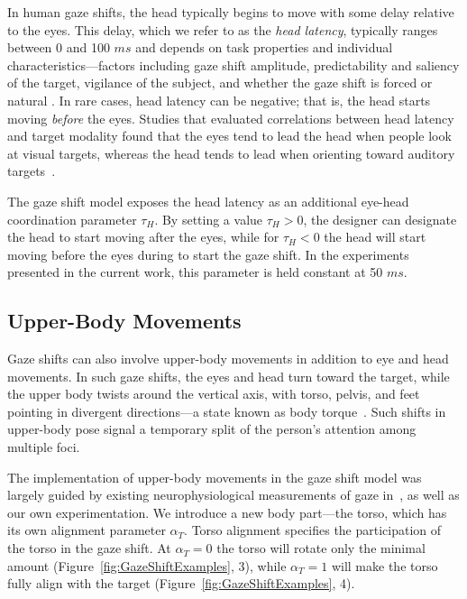 In human gaze shifts, the head typically begins to move with some delay relative to the eyes. This delay, which we refer to as the \emph{head latency}, typically ranges between 0 and 100 $ms$ and depends on task properties and individual characteristics---factors including gaze shift amplitude, predictability and saliency of the target, vigilance of the subject, and whether the gaze shift is forced or natural \citep{pelz2001coordination,zangemeister1982types}. In rare cases, head latency can be negative; that is, the head starts moving \emph{before} the eyes. Studies that evaluated correlations between head latency and target modality found that the eyes tend to lead the head when people look at visual targets, whereas the head tends to lead when orienting toward auditory targets~\citep{goldring1996combined,goossens1997human}.

The gaze shift model exposes the head latency as an additional eye-head coordination parameter $\tau_H$. By setting a value $\tau_H > 0$, the designer can designate the head to start moving after the eyes, while for $\tau_H < 0$ the head will start moving before the eyes during to start the gaze shift. In the experiments presented in the current work, this parameter is held constant at 50 $ms$.

\subsection{Upper-Body Movements}
\label{sec:GazeShiftUpperBody}

Gaze shifts can also involve upper-body movements in addition to eye and head movements. In such gaze shifts, the eyes and head turn toward the target, while the upper body twists around the vertical axis, with torso, pelvis, and feet pointing in divergent directions---a state known as body torque~\citep{schegloff1998bodytorque}. Such shifts in upper-body pose signal a temporary split of the person's attention among multiple foci.

The implementation of upper-body movements in the gaze shift model was largely guided by existing neurophysiological measurements of gaze in~\citep{mccluskey2007monkeys}, as well as our own experimentation. We introduce a new body part---the torso, which has its own alignment parameter $\alpha_T$. Torso alignment specifies the participation of the torso in the gaze shift. At $\alpha_T = 0$ the torso will rotate only the minimal amount (Figure~\ref{fig:GazeShiftExamples}, 3), while $\alpha_T = 1$ will make the torso fully align with the target (Figure~\ref{fig:GazeShiftExamples}, 4).


